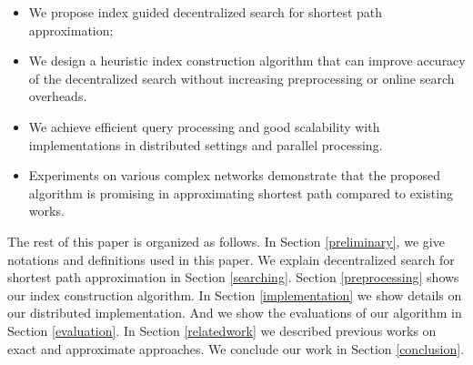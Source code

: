 \begin{itemize}
	\item We propose index guided decentralized search for shortest path approximation;
	\item We design a heuristic index construction algorithm that can improve accuracy of the decentralized search without increasing preprocessing or online search overheads.
	\item We achieve efficient query processing and good scalability with implementations in distributed settings and parallel processing.
	\item Experiments on various complex networks demonstrate that the proposed algorithm is promising in approximating shortest path compared to existing works.
\end{itemize}

The rest of this paper is organized as follows. In Section \ref{preliminary}, we give notations and definitions used in this paper. We explain decentralized search for shortest path approximation in Section \ref{searching}. Section \ref{preprocessing} shows our index construction algorithm. In Section \ref{implementation} we show details on our distributed implementation. And we show the evaluations of our algorithm in Section \ref{evaluation}. In Section \ref{relatedwork} we described previous works on exact and approximate approaches. We conclude our work in Section \ref{conclusion}.
